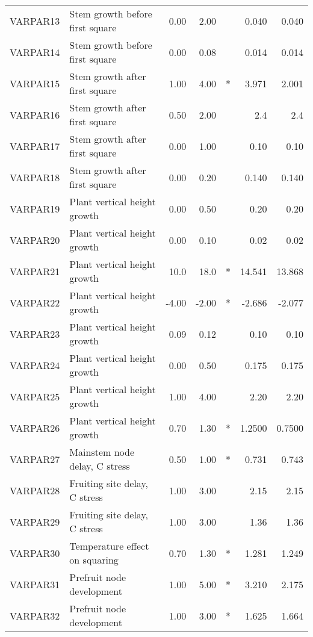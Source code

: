 \begin{longtable}{llrrcrr}
    VARPAR13 & Stem growth before first square  & 0.00   & 2.00   &     & 0.040   & 0.040   \\
    VARPAR14 & Stem growth before first square  & 0.00   & 0.08   &     & 0.014   & 0.014   \\
    VARPAR15 & Stem growth after first square   & 1.00   & 4.00   & *   & 3.971   & 2.001   \\
    VARPAR16 & Stem growth after first square   & 0.50   & 2.00   &     & 2.4     & 2.4     \\
    VARPAR17 & Stem growth after first square   & 0.00   & 1.00   &     & 0.10    & 0.10    \\
    VARPAR18 & Stem growth after first square   & 0.00   & 0.20   &     & 0.140   & 0.140   \\
    VARPAR19 & Plant vertical height growth     & 0.00   & 0.50   &     & 0.20    & 0.20    \\
    VARPAR20 & Plant vertical height growth     & 0.00   & 0.10   &     & 0.02    & 0.02    \\
    VARPAR21 & Plant vertical height growth     & 10.0   & 18.0   & *   & 14.541  & 13.868  \\
    VARPAR22 & Plant vertical height growth     & -4.00  & -2.00  & *   & -2.686  & -2.077  \\
    VARPAR23 & Plant vertical height growth     & 0.09   & 0.12   &     & 0.10    & 0.10    \\
    VARPAR24 & Plant vertical height growth     & 0.00   & 0.50   &     & 0.175   & 0.175   \\
    VARPAR25 & Plant vertical height growth     & 1.00   & 4.00   &     & 2.20    & 2.20    \\
    VARPAR26 & Plant vertical height growth     & 0.70   & 1.30   & *   & 1.2500  & 0.7500  \\
    VARPAR27 & Mainstem node delay, C stress    & 0.50   & 1.00   & *   & 0.731   & 0.743   \\
    VARPAR28 & Fruiting site delay, C stress    & 1.00   & 3.00   &     & 2.15    & 2.15    \\
    VARPAR29 & Fruiting site delay, C stress    & 1.00   & 3.00   &     & 1.36    & 1.36    \\
    VARPAR30 & Temperature effect on squaring   & 0.70   & 1.30   & *   & 1.281   & 1.249   \\
    VARPAR31 & Prefruit node development        & 1.00   & 5.00   & *   & 3.210   & 2.175   \\
    VARPAR32 & Prefruit node development        & 1.00   & 3.00   & *   & 1.625   & 1.664   \\

\end{longtable}
